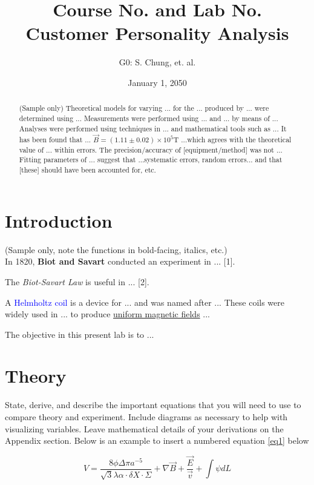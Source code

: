 \documentclass[letterpaper,11pt]{article}
\begin{document}
\title{Course No. and Lab No. \\\textbf{Customer Personality Analysis}}
\author{G0: S. Chung, et. al.}
\date{January 1, 2050}
\maketitle

\begin{abstract}
(Sample only) Theoretical models for varying ... for the ... produced by ... were determined using ... Measurements were performed using ... and ... by means of ... Analyses were performed using techniques in ... and mathematical tools such as ... It has been found that ... $\vec{B}= (1.11 \pm 0.02)\times10^5\text{T}$ ...which agrees with the theoretical value of ... within errors. The precision/accuracy of [equipment/method] was not ... Fitting parameters of ... suggest that ...systematic errors, random errors... and that [these] should have been accounted for, etc. 
\end{abstract}

\section{Introduction}

(Sample only, note the functions in bold-facing, italics, etc.) \\In 1820, \textbf{Biot and Savart} conducted an experiment in ... [1]. 

The \textit{Biot-Savart Law} is useful in ... [2].

A \textcolor{blue}{Helmholtz coil} is a device for ... and was named after ... These coils were widely used in ... to produce \underline{uniform magnetic fields} ...

The objective in this present lab is to ...

\section{Theory}

State, derive, and describe the important equations that you will need to use to compare theory and experiment. Include diagrams as necessary to help with visualizing variables. Leave mathematical details of your derivations on the Appendix section. Below is an example to insert a numbered equation \ref{eq1} below

\begin{equation} \label{eq1} %
V=\frac{8\phi\Delta\pi a^{-5}}{\sqrt{3}\lambda\alpha\cdot\delta X \cdot\Sigma}+\nabla\vec{B}+\frac{\vec{E}}{\vec{v}}+\int \psi dL
\end{equation}
\end{document}
